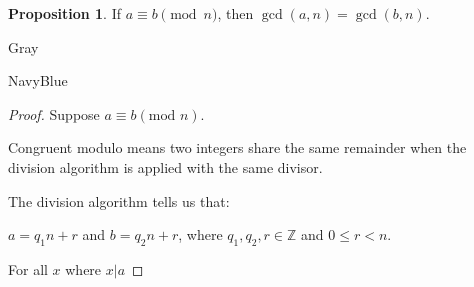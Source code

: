 \documentclass[12pt]{amsart}
\theoremstyle{named}
\newenvironment{prf}
{\medskip\begin{color}{Gray}\begin{framed}\begin{color}{NavyBlue}\begin{proof}[Proof]
\doublespacing}
{\end{proof}\end{color}\end{framed}\end{color}\medskip}
\theoremstyle{definition}
\newtheorem{proposition}{Proposition}
\begin{document}
\begin{proposition}
	If $a\equiv b\pmod n$, then $\gcd(a,n) = \gcd(b,n)$.
\end{proposition}

\begin{prf}
	\phantom{ }

	Suppose $a \equiv b (\text{mod } n)$.

	Congruent modulo means two integers share the same remainder
	when the division algorithm is applied with the same divisor.

	The division algorithm tells us that:

	$a = q_1n + r$ and $b = q_2n + r$, where $q_1, q_2, r \in 
	\mathbb Z$ and $0 \leq r < n$. 

	For all $x$ where $x|a$
\end{prf}
\end{document}
